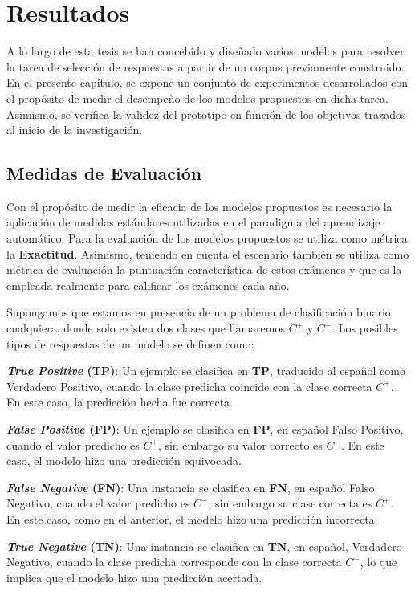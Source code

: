 \chapter{Resultados}\label{chapter:results}

A lo largo de esta tesis se han concebido y diseñado varios modelos para resolver la tarea de selección de respuestas a partir de un corpus previamente construido. En el presente capítulo, se expone un conjunto de experimentos desarrollados con el propósito de medir el desempeño de los modelos propuestos en dicha tarea. Asimismo, se verifica la validez del prototipo en función de los objetivos trazados al inicio de la investigación.

\section{Medidas de Evaluación}

Con el propósito de medir la eficacia de los modelos propuestos es necesario la aplicación de medidas estándares utilizadas en el paradigma del aprendizaje automático. Para la evaluación de los modelos propuestos se utiliza como métrica la \textbf{Exactitud}. Asimismo, teniendo en cuenta el escenario también se utiliza como métrica de evaluación la puntuación característica de estos exámenes y que es la empleada realmente para calificar los exámenes cada año.

Supongamos que estamos en presencia de un problema de clasificación binario cualquiera, donde solo existen dos clases que llamaremos $C^{+}$ y $C^{-}$. Los posibles tipos de respuestas de un modelo se definen como:

\begin{description}
  \item \textbf{\textit{True Positive} (TP)}: Un ejemplo se clasifica en \textbf{TP}, traducido al español como Verdadero Positivo, cuando la clase predicha coincide con la clase correcta $C^{+}$. En este caso, la predicción hecha fue correcta.
  \item \textbf{\textit{False Positive} (FP)}: Un ejemplo se clasifica en \textbf{FP}, en español Falso Positivo, cuando el valor predicho es $C^{+}$, sin embargo su valor correcto es $C^{-}$. En este caso, el modelo hizo una predicción equivocada.
  \item \textbf{\textit{False Negative} (FN)}: Una instancia se clasifica en \textbf{FN}, en español Falso Negativo, cuando el valor predicho es $C^{-}$, sin embargo su clase correcta es $C^{+}$. En este caso, como en el anterior, el modelo hizo una predicción incorrecta.
  \item \textbf{\textit{True Negative} (TN)}: Una instancia se clasifica en \textbf{TN}, en español, Verdadero Negativo, cuando la clase predicha corresponde con la clase correcta $C^{-}$, lo que implica que el modelo hizo una predicción acertada.
\end{description}

